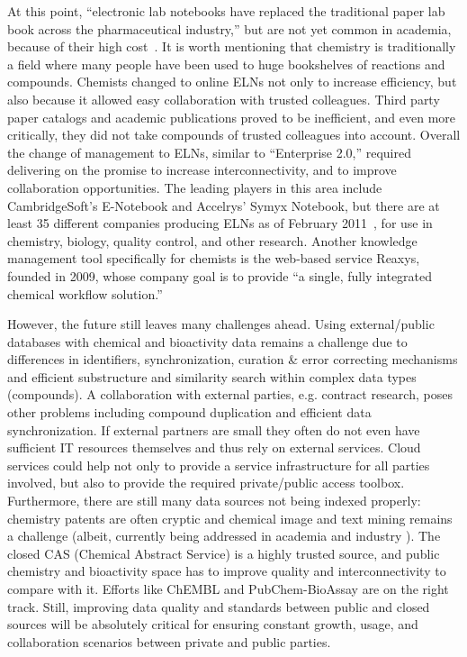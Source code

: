 \documentclass{sig-alternate}
\begin{document}
At this point, ``electronic lab notebooks have replaced the
traditional paper lab book across the pharmaceutical industry,'' but
are not yet common in academia, because of their high
cost~\cite{WavingGoodbye}.  It is worth mentioning that chemistry is
traditionally a field where many people have been used to huge
bookshelves of reactions and compounds. Chemists changed to online
ELNs not only to increase efficiency, but also because it allowed easy
collaboration with trusted colleagues. Third party paper catalogs and
academic publications proved to be inefficient, and even more
critically, they did not take compounds of trusted colleagues into
account. Overall the change of management to ELNs, similar to
``Enterprise 2.0,'' required delivering on the promise to increase
interconnectivity, and to improve collaboration opportunities.  The
leading players in this area include CambridgeSoft's E-Notebook and
Accelrys' Symyx Notebook, but there are at least 35 different
companies producing ELNs as of February 2011~\cite{ELNreview}, for use
in chemistry, biology, quality control, and other research.  Another
knowledge management tool specifically for chemists is the web-based
service Reaxys, founded in 2009, whose company goal is to provide ``a
single, fully integrated chemical workflow solution.''

However, the future still leaves many challenges ahead. Using
external/public databases with chemical and bioactivity data remains a
challenge due to differences in identifiers, synchronization, curation
\& error correcting mechanisms and efficient substructure and
similarity search within complex data types (compounds). A
collaboration with external parties, e.g. contract research, poses
other problems including compound duplication and efficient data
synchronization. If external partners are small they often do not even
have sufficient IT resources themselves and thus rely on external
services. Cloud services could help not only to provide a service
infrastructure for all parties involved, but also to provide the
required private/public access toolbox. Furthermore, there are still
many data sources not being indexed properly: chemistry patents are
often cryptic and chemical image and text mining remains a challenge
(albeit, currently being addressed in academia and industry
\cite{Jessop:2011fk,Sayle:2009uq}). The closed CAS (Chemical Abstract
Service) is a highly trusted source, and public chemistry and
bioactivity space has to improve quality and interconnectivity to
compare with it. Efforts like ChEMBL and PubChem-BioAssay are on the
right track. Still, improving data quality and standards between
public and closed sources will be absolutely critical for ensuring
constant growth, usage, and collaboration scenarios between private
and public parties.
\end{document}
